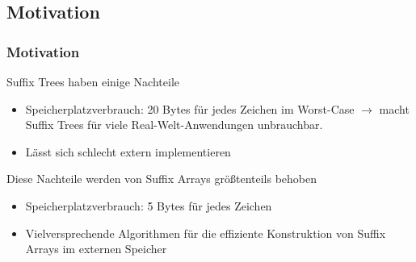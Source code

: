 \documentclass{beamer}
\begin{document}
\frame{\sectionpage}

\subsection{Motivation}

\begin{frame}[fragile]
\frametitle{Motivation}
Suffix Trees haben einige Nachteile
\begin{itemize}
    \item Speicherplatzverbrauch: 20 Bytes für jedes Zeichen im Worst-Case $\rightarrow$ macht Suffix Trees für viele Real-Welt-Anwendungen unbrauchbar.
    \item Lässt sich schlecht extern implementieren
\end{itemize}
\vspace{5mm}
Diese Nachteile werden von Suffix Arrays größtenteils behoben
\begin{itemize}
    \item Speicherplatzverbrauch: 5 Bytes für jedes Zeichen
    \item Vielversprechende Algorithmen für die effiziente Konstruktion von Suffix Arrays im externen Speicher
\end{itemize}
\end{frame}
\end{document}
